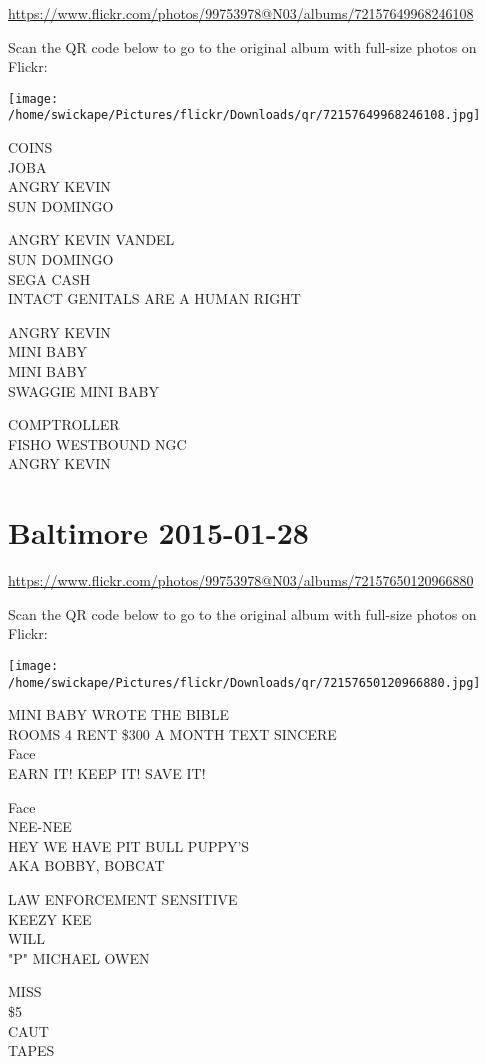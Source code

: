 \documentclass[10pt,letterpaper]{article}
\begin{document}
\url{https://www.flickr.com/photos/99753978@N03/albums/72157649968246108}

Scan the QR code below to go to the original album with full-size photos on Flickr:

\texttt{[image: /home/swickape/Pictures/flickr/Downloads/qr/72157649968246108.jpg]}


COINS\\
JOBA\\
ANGRY KEVIN\\
SUN DOMINGO

ANGRY KEVIN VANDEL\\
SUN DOMINGO\\
SEGA CASH\\
INTACT GENITALS ARE A HUMAN RIGHT

ANGRY KEVIN\\
MINI BABY\\
MINI BABY\\
SWAGGIE MINI BABY

COMPTROLLER\\
FISHO WESTBOUND NGC\\
ANGRY KEVIN


\section*{Baltimore 2015-01-28}

\url{https://www.flickr.com/photos/99753978@N03/albums/72157650120966880}

Scan the QR code below to go to the original album with full-size photos on Flickr:

\texttt{[image: /home/swickape/Pictures/flickr/Downloads/qr/72157650120966880.jpg]}


MINI BABY WROTE THE BIBLE\\
ROOMS 4 RENT \$300 A MONTH TEXT SINCERE\\
Face\\
EARN IT!  KEEP IT!  SAVE IT!

Face\\
NEE{-}NEE\\
HEY WE HAVE PIT BULL PUPPY'S\\
AKA BOBBY, BOBCAT

LAW ENFORCEMENT SENSITIVE\\
KEEZY KEE\\
WILL\\
"P" MICHAEL OWEN

MISS\\
\$5\\
CAUT\\
TAPES
\end{document}
